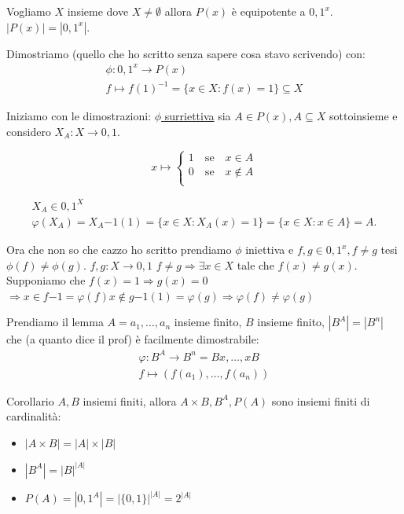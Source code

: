 \documentclass{article}
\theoremstyle{definition}
\begin{document}
Vogliamo $X$ insieme dove $X \not = \emptyset$ allora $P(x)$ è equipotente a ${0,1}^x$. \newline
$|P(x)| = |{0,1}^x|$.

Dimostriamo (quello che ho scritto senza sapere cosa stavo scrivendo) con:
\begin{align*}
        \phi : {0,1}^x \to P(x) \\
        f \mapsto {f(1)}^{-1} = \{x \in X : f(x) = 1\} \subseteq X
\end{align*}

Iniziamo con le dimostrazioni:
\underline{$\phi$ surriettiva} sia $A \in P(x), A \subseteq X$ sottoinsieme e considero $X_A : X \to {0,1}$.


\[x \mapsto  
\begin{cases}
        1 \quad \mbox{se} \quad x \in A \\
        0 \quad \mbox{se} \quad x \not \in A \\
\end{cases}
\]

\begin{align*}
X_A \in {0,1}^X \\
\varphi(X_A) = {X_A}{-1}(1) = \{x \in X : X_A(x) = 1\} = \{x \in X : x \in A\} = A.
\end{align*}

Ora che non so che cazzo ho scritto prendiamo $\phi$ iniettiva e $f,g \in {0,1}^x, f \not = g$ tesi $\phi(f) \not = \phi(g)$.
$f,g : X \to {0,1}$ \newline
$f \not = g \Rightarrow \exists x \in X$ tale che $f(x) \not = g(x)$.
Supponiamo che $f(x) = 1 \Rightarrow g(x) = 0$ \newline
$\Rightarrow x \in {f}{-1} = \varphi(f) x \not \in {g}{-1}(1) = \varphi(g) \Rightarrow \varphi(f) \not = \varphi(g)$

Prendiamo il lemma $A = {a_1,\ldots,a_n}$ insieme finito, $B$ insieme finito, $|B^A| = |B^n|$ che (a quanto dice il prof) è facilmente dimostrabile:
\begin{align*}
         \varphi : B^A \to B^n = Bx,\ldots,xB \\
                   f \mapsto (f(a_1),\ldots,f(a_n))
\end{align*}

Corollario $A,B$ insiemi finiti, allora $A \times B, B^A, P(A)$ sono insiemi finiti di cardinalità:
\begin{itemize}
        \item $|A \times B| = |A| \times |B|$	
        \item $|B^A| = |B|^{|A|}$
        \item $P(A) = |{0,1}^A| = |\{0,1\}|^{|A|} = 2^{|A|}$	
\end{itemize}
\end{document}
